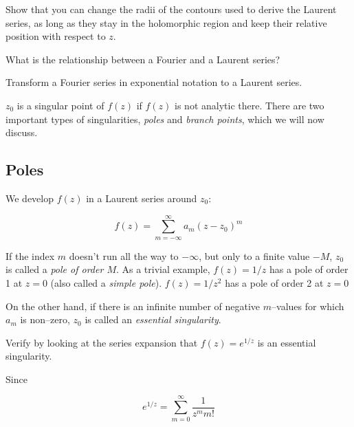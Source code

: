 \begin{exer}
  Show that you can change the radii of the contours used to derive the Laurent series, as long as they stay in the holomorphic region and keep their relative position with respect to $z$.

\end{exer}

\begin{exer}
  What is the relationship between a Fourier and a Laurent series?
  \begin{hnt}
  Transform a Fourier series in exponential notation to a Laurent series.
  \end{hnt}
\end{exer}


\pagebreak



$z_0$ is a singular point of $f(z)$ if $f(z)$ is not analytic there. There are two important types of singularities, \emph{poles} and \emph{branch points}, which we will now discuss.

\subsection*{Poles}

We develop $f(z)$ in a Laurent series around $z_0$:

\begin{equation}
f(z)= \sum_{m=-\infty}^{\infty} a_m (z-z_0)^m
\end{equation} 

If the index $m$ doesn't run all the way to $-\infty$, but only to a finite value $-M$, $z_0$ is called a \emph{pole of order $M$}. As a trivial example, $f(z)=1/z$ has a pole of order 1 at $z=0$ (also called a \emph{simple pole}). $f(z)=1/z^2$ has a pole of order 2 at $z=0$

On the other hand, if there is an infinite number of negative $m$--values for which $a_m$ is non--zero, $z_0$ is called an \emph{essential singularity}.

\begin{cue}
  Verify by looking at the series expansion that $f(z)=e^{1/z}$ is an essential singularity.  
\end{cue}

Since

$$e^{1/z} = \sum_{m=0}^{\infty} \frac{1}{z^m m!} $$

